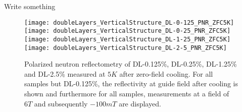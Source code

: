 \documentclass[\main/dresen_thesis.tex]{subfiles}
\begin{document}
  \label{sec:doubleLayers:pnr}
  Write something


  \begin{figure}[tb]
    \centering
    \texttt{[image: doubleLayers\_VerticalStructure\_DL-0-125\_PNR\_ZFC5K]}
    \texttt{[image: doubleLayers\_VerticalStructure\_DL-0-25\_PNR\_ZFC5K]}
    \texttt{[image: doubleLayers\_VerticalStructure\_DL-1-25\_PNR\_ZFC5K]}
    \texttt{[image: doubleLayers\_VerticalStructure\_DL-2-5\_PNR\_ZFC5K]}
    \caption{\label{fig:doubleLayers:pnrData}Polarized neutron reflectometry of DL-0.125\%, DL-0.25\%, DL-1.25\% and DL-2.5\% measured at $5 \unit{K}$ after zero-field cooling. For all samples but DL-0.125\%, the reflectivity at guide field after cooling is shown and furthermore for all samples, measurements at a field of $6 \unit{T}$ and subsequently $-100 \unit{mT}$ are displayed.}
  \end{figure}
\end{document}
